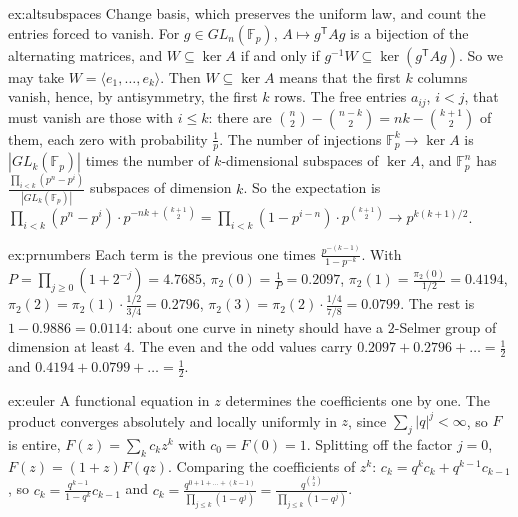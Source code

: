 \begin{solution}{ex:altsubspaces}
\idea Change basis, which preserves the uniform law, and count the entries forced to vanish.
\writeup For $g\in GL_n(\mathbb F_p)$, $A\mapsto g^{\mathsf T}Ag$ is a bijection of the alternating matrices, and $W\subseteq\ker A$ if and only if $g^{-1}W\subseteq\ker(g^{\mathsf T}Ag)$. So we may take $W=\langle e_1,\dots,e_k\rangle$. Then $W\subseteq\ker A$ means that the first $k$ columns vanish, hence, by antisymmetry, the first $k$ rows. The free entries $a_{ij}$, $i<j$, that must vanish are those with $i\le k$: there are $\binom n2-\binom{n-k}2=nk-\binom{k+1}2$ of them, each zero with probability $\frac1p$. The number of injections $\mathbb F_p^k\to\ker A$ is $|GL_k(\mathbb F_p)|$ times the number of $k$-dimensional subspaces of $\ker A$, and $\mathbb F_p^n$ has $\frac{\prod_{i<k}(p^n-p^i)}{|GL_k(\mathbb F_p)|}$ subspaces of dimension $k$. So the expectation is $\prod_{i<k}(p^n-p^i)\cdot p^{-nk+\binom{k+1}2}=\prod_{i<k}(1-p^{i-n})\cdot p^{\binom{k+1}2}\to p^{k(k+1)/2}$.
\end{solution}

\begin{solution}{ex:prnumbers}
\idea Each term is the previous one times $\frac{p^{-(k-1)}}{1-p^{-k}}$.
\writeup With $P=\prod_{j\ge0}(1+2^{-j})=4.7685$, $\pi_2(0)=\frac1P=0.2097$, $\pi_2(1)=\frac{\pi_2(0)}{1/2}=0.4194$, $\pi_2(2)=\pi_2(1)\cdot\frac{1/2}{3/4}=0.2796$, $\pi_2(3)=\pi_2(2)\cdot\frac{1/4}{7/8}=0.0799$. The rest is $1-0.9886=0.0114$: about one curve in ninety should have a $2$-Selmer group of dimension at least $4$. The even and the odd values carry $0.2097+0.2796+\dots=\frac12$ and $0.4194+0.0799+\dots=\frac12$.
\end{solution}

\begin{solution}{ex:euler}
\idea A functional equation in $z$ determines the coefficients one by one.
\writeup The product converges absolutely and locally uniformly in $z$, since $\sum_j|q|^j<\infty$, so $F$ is entire, $F(z)=\sum_kc_kz^k$ with $c_0=F(0)=1$. Splitting off the factor $j=0$, $F(z)=(1+z)F(qz)$. Comparing the coefficients of $z^k$: $c_k=q^kc_k+q^{k-1}c_{k-1}$, so $c_k=\frac{q^{k-1}}{1-q^k}c_{k-1}$ and $c_k=\frac{q^{0+1+\dots+(k-1)}}{\prod_{j\le k}(1-q^j)}=\frac{q^{\binom k2}}{\prod_{j\le k}(1-q^j)}$.
\end{solution}


